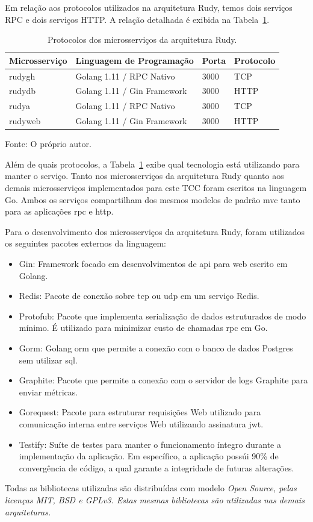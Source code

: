 Em relação aos protocolos utilizados na arquitetura Rudy, temos dois serviços RPC e dois serviços HTTP.
%
A relação detalhada é exibida na Tabela~\ref{tab:protocolos_rudy}.



\begin{table}[htb!]
    \centering
    \caption{Protocolos dos microsserviços da arquitetura Rudy.}
    \label{tab:protocolos_rudy}
    \begin{tabular}{|l|l|l|l|}
    \hline
    Microsserviço & Linguagem de Programação    & Porta & Protocolo \\ \hline
    rudygh        & Golang 1.11 / RPC Nativo    & 3000  & TCP       \\ \hline
    rudydb        & Golang 1.11 / Gin Framework & 3000  & HTTP      \\ \hline
    rudya         & Golang 1.11 / RPC Nativo    & 3000  & TCP       \\ \hline
    rudyweb       & Golang 1.11 / Gin Framework & 3000  & HTTP      \\ \hline
    \end{tabular}
    
    Fonte: O próprio autor.
\end{table}

Além de quais protocolos, a Tabela~\ref{tab:protocolos_rudy} exibe qual tecnologia está utilizando para manter o serviço.
%
Tanto nos microsserviços da arquitetura Rudy quanto aos demais microsserviços implementados para este TCC foram escritos na linguagem Go.
%
Ambos os serviços compartilham dos mesmos modelos de padrão \ac{mvc} tanto para as aplicações \ac{rpc} e \ac{http}.

Para o desenvolvimento dos microsserviços da arquitetura Rudy, foram utilizados os seguintes pacotes externos da linguagem:

\begin{itemize}
    \item Gin: Framework focado em desenvolvimentos de \ac{api} para web escrito em Golang.
    \item Redis: Pacote de conexão sobre \ac{tcp} ou \ac{udp} em um serviço Redis.
    \item Protofub: Pacote que implementa serialização de dados estruturados de modo mínimo. É utilizado para minimizar custo de chamadas \ac{rpc} em Go.
    \item Gorm: Golang \ac{orm} que permite a conexão com o banco de dados Postgres sem utilizar \ac{sql}.
    \item Graphite: Pacote que permite a conexão com o servidor de logs Graphite para enviar métricas.
    \item Gorequest: Pacote para estruturar requisições Web utilizado para comunicação interna entre serviços Web utilizando assinatura \ac{jwt}.
    \item Testify: Suíte de testes para manter o funcionamento íntegro durante a implementação da aplicação. Em específico, a aplicação possúi 90\% de convergência de código, a qual garante a integridade de futuras alterações.
\end{itemize}

Todas as bibliotecas utilizadas são distribuídas com modelo \it{Open Source}, pelas licenças \it{MIT}, \it{BSD} e \it{GPLv3}.
%
Estas mesmas bibliotecas são utilizadas nas demais arquiteturas.